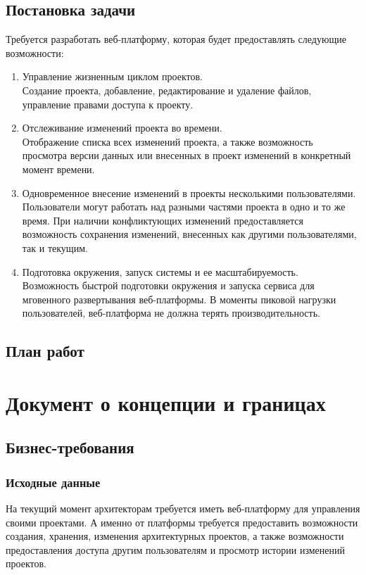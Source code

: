 \documentclass[a4paper,14pt]{extreport} %
\begin{document}
\section{Постановка задачи}
Требуется разработать веб-платформу, которая будет предоставлять следующие возможности:
\begin{enumerate}
\item Управление жизненным циклом проектов. \\
Создание проекта, добавление, редактирование  и удаление файлов, управление правами доступа к проекту.
\item Отслеживание изменений проекта во времени. \\
Отображение списка всех изменений проекта, а также возможность просмотра версии данных или внесенных в проект изменений в конкретный момент времени.
\item Одновременное внесение изменений в проекты несколькими пользователями. \\
Пользователи могут работать над разными частями проекта в одно и то же время. При наличии конфликтующих изменений предоставляется возможность сохранения изменений, внесенных как другими пользователями, так и текущим.
\item Подготовка окружения, запуск системы и ее масштабируемость. \\
Возможность быстрой подготовки окружения и запуска сервиса для мговенного развертывания веб-платформы. В моменты пиковой нагрузки пользователей, веб-платформа не должна терять производительность.
\end{enumerate}

\newpage
\section{План работ}

\newpage

\chapter{Документ о концепции и границах}
\section{Бизнес-требования}
\subsection{Исходные данные}

На текущий момент архитекторам требуется иметь веб-платформу для управления своими проектами. А именно от платформы требуется предоставить возможности создания, хранения, изменения архитектурных проектов, а также возможности предоставления  доступа другим пользователям и просмотр истории изменений проектов.
\end{document}

